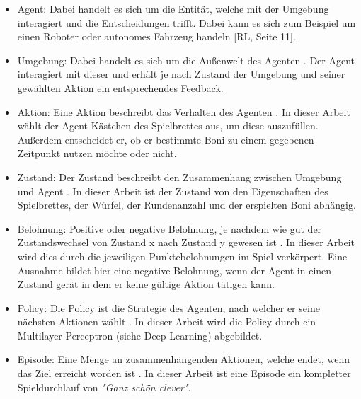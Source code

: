\begin{itemize}
\item Agent: Dabei handelt es sich um die Entität, welche mit der Umgebung interagiert und die Entscheidungen trifft. Dabei kann es sich zum Beispiel um einen Roboter oder autonomes Fahrzeug handeln [RL, Seite 11].

\item Umgebung: Dabei handelt es sich um die Außenwelt des Agenten \cite[Seite 11]{ris-ala_fundamentals_2023}. Der Agent interagiert mit dieser und erhält je nach Zustand der Umgebung und seiner gewählten Aktion ein entsprechendes Feedback.

\item Aktion: Eine Aktion beschreibt das Verhalten des Agenten \cite[Seite 11]{ris-ala_fundamentals_2023}. In dieser Arbeit wählt der Agent Kästchen des Spielbrettes aus, um diese auszufüllen. Außerdem entscheidet er, ob er bestimmte Boni zu einem gegebenen Zeitpunkt nutzen möchte oder nicht.

\item Zustand: Der Zustand beschreibt den Zusammenhang zwischen Umgebung und Agent \cite[Seite 11]{ris-ala_fundamentals_2023}. In dieser Arbeit ist der Zustand von den Eigenschaften des Spielbrettes, der Würfel, der Rundenanzahl und der erspielten Boni abhängig.

\item Belohnung: Positive oder negative Belohnung, je nachdem wie gut der Zustandswechsel von Zustand x nach Zustand y gewesen ist \cite[Seite 11]{ris-ala_fundamentals_2023}. In dieser Arbeit wird dies durch die jeweiligen Punktebelohnungen im Spiel verkörpert. Eine Ausnahme bildet hier eine negative Belohnung, wenn der Agent in einen Zustand gerät in dem er keine gültige Aktion tätigen kann.

\item Policy: Die Policy ist die Strategie des Agenten, nach welcher er seine nächsten Aktionen wählt \cite[Seite 11]{ris-ala_fundamentals_2023}. In dieser Arbeit wird die Policy durch ein Multilayer Perceptron (siehe Deep Learning) abgebildet.

\item Episode: Eine Menge an zusammenhängenden Aktionen, welche endet, wenn das Ziel erreicht worden ist \cite[Seite 11]{ris-ala_fundamentals_2023}. In dieser Arbeit ist eine Episode ein kompletter Spieldurchlauf von \textit{"Ganz schön clever"}.
\end{itemize}

